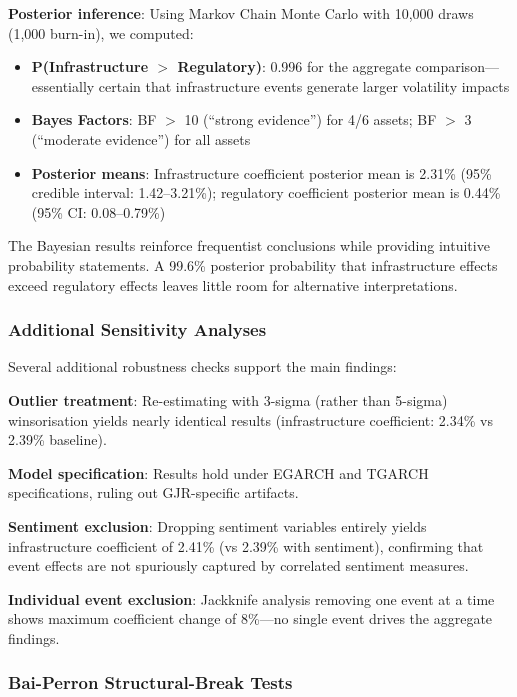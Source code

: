 \documentclass[pdflatex,sn-mathphys-num]{sn-jnl}
\theoremstyle{thmstyleone}
\theoremstyle{thmstyletwo}
\theoremstyle{thmstylethree}
\begin{document}
\textbf{Posterior inference}: Using Markov Chain Monte Carlo with 10,000 draws (1,000 burn-in), we computed:
\begin{itemize}[nosep]
\item \textbf{P(Infrastructure $>$ Regulatory)}: 0.996 for the aggregate comparison---essentially certain that infrastructure events generate larger volatility impacts
\item \textbf{Bayes Factors}: BF $>$ 10 (``strong evidence'') for 4/6 assets; BF $>$ 3 (``moderate evidence'') for all assets
\item \textbf{Posterior means}: Infrastructure coefficient posterior mean is 2.31\% (95\% credible interval: 1.42--3.21\%); regulatory coefficient posterior mean is 0.44\% (95\% CI: 0.08--0.79\%)
\end{itemize}

The Bayesian results reinforce frequentist conclusions while providing intuitive probability statements. A 99.6\% posterior probability that infrastructure effects exceed regulatory effects leaves little room for alternative interpretations.

\subsubsection{Additional Sensitivity Analyses}

Several additional robustness checks support the main findings:

\textbf{Outlier treatment}: Re-estimating with 3-sigma (rather than 5-sigma) winsorisation yields nearly identical results (infrastructure coefficient: 2.34\% vs 2.39\% baseline).

\textbf{Model specification}: Results hold under EGARCH and TGARCH specifications, ruling out GJR-specific artifacts.

\textbf{Sentiment exclusion}: Dropping sentiment variables entirely yields infrastructure coefficient of 2.41\% (vs 2.39\% with sentiment), confirming that event effects are not spuriously captured by correlated sentiment measures.

\textbf{Individual event exclusion}: Jackknife analysis removing one event at a time shows maximum coefficient change of 8\%---no single event drives the aggregate findings.

\subsubsection{Bai-Perron Structural-Break Tests}\label{sec:bai_perron}
\end{document}
